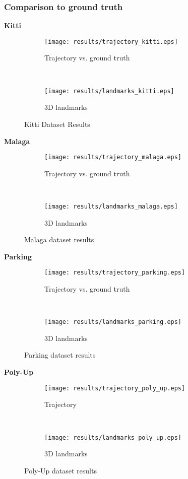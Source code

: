 \subsubsection{Comparison to ground truth}
\textbf{Kitti}
\begin{figure*}[ht!]
    \centering
    \begin{subfigure}[t]{0.5\textwidth}
        \centering
        \texttt{[image: results/trajectory\_kitti.eps]}
        \caption{Trajectory vs. ground truth}
    \end{subfigure}%
    ~ 
    \begin{subfigure}[t]{0.5\textwidth}
        \centering
        \texttt{[image: results/landmarks\_kitti.eps]}
        \caption{3D landmarks}
    \end{subfigure}
    \caption{Kitti Dataset Results}
		\label{parking_result_fig}
\end{figure*}

\textbf{Malaga}
\begin{figure*}[ht!]
    \centering
    \begin{subfigure}[t]{0.5\textwidth}
        \centering
        \texttt{[image: results/trajectory\_malaga.eps]}
        \caption{Trajectory vs. ground truth}
    \end{subfigure}%
    ~ 
    \begin{subfigure}[t]{0.5\textwidth}
        \centering
        \texttt{[image: results/landmarks\_malaga.eps]}
        \caption{3D landmarks}
    \end{subfigure}
    \caption{Malaga dataset results}
		\label{parking_result_fig}
\end{figure*}

\textbf{Parking}
\begin{figure*}[ht!]
    \centering
    \begin{subfigure}[t]{0.5\textwidth}
        \centering
        \texttt{[image: results/trajectory\_parking.eps]}
        \caption{Trajectory vs. ground truth}
    \end{subfigure}%
    ~ 
    \begin{subfigure}[t]{0.5\textwidth}
        \centering
        \texttt{[image: results/landmarks\_parking.eps]}
        \caption{3D landmarks}
    \end{subfigure}
    \caption{Parking dataset results}
		\label{parking_result_fig}
\end{figure*}

\textbf{Poly-Up}
\begin{figure*}[ht!]
    \centering
    \begin{subfigure}[t]{0.5\textwidth}
        \centering
        \texttt{[image: results/trajectory\_poly\_up.eps]}
        \caption{Trajectory}
    \end{subfigure}%
    ~ 
    \begin{subfigure}[t]{0.5\textwidth}
        \centering
        \texttt{[image: results/landmarks\_poly\_up.eps]}
        \caption{3D landmarks}
    \end{subfigure}
    \caption{Poly-Up dataset results}
		\label{poly_up_result_fig}
\end{figure*}

